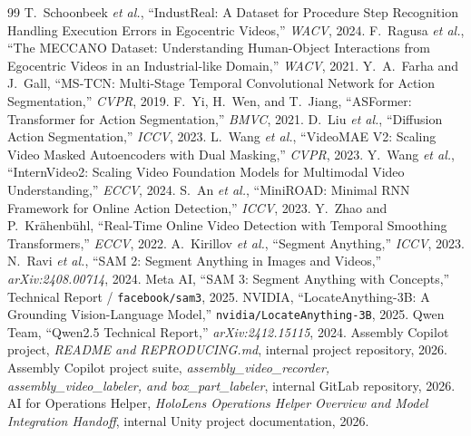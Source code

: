 \documentclass[11pt]{article}
\begin{document}
\begin{thebibliography}{99}
\small
{} T.~Schoonbeek \emph{et al.}, ``IndustReal: A Dataset for Procedure Step Recognition Handling
Execution Errors in Egocentric Videos,'' \emph{WACV}, 2024.
 F.~Ragusa \emph{et al.}, ``The MECCANO Dataset: Understanding Human-Object Interactions from
Egocentric Videos in an Industrial-like Domain,'' \emph{WACV}, 2021.
 Y.~A.~Farha and J.~Gall, ``MS-TCN: Multi-Stage Temporal Convolutional Network for Action
Segmentation,'' \emph{CVPR}, 2019.
 F.~Yi, H.~Wen, and T.~Jiang, ``ASFormer: Transformer for Action Segmentation,'' \emph{BMVC}, 2021.
 D.~Liu \emph{et al.}, ``Diffusion Action Segmentation,'' \emph{ICCV}, 2023.
 L.~Wang \emph{et al.}, ``VideoMAE V2: Scaling Video Masked Autoencoders with Dual Masking,''
\emph{CVPR}, 2023.
 Y.~Wang \emph{et al.}, ``InternVideo2: Scaling Video Foundation Models for Multimodal Video
Understanding,'' \emph{ECCV}, 2024.
 S.~An \emph{et al.}, ``MiniROAD: Minimal RNN Framework for Online Action Detection,''
\emph{ICCV}, 2023.
 Y.~Zhao and P.~Kr\"ahenb\"uhl, ``Real-Time Online Video Detection with Temporal Smoothing
Transformers,'' \emph{ECCV}, 2022.
 A.~Kirillov \emph{et al.}, ``Segment Anything,'' \emph{ICCV}, 2023.
 N.~Ravi \emph{et al.}, ``SAM 2: Segment Anything in Images and Videos,'' \emph{arXiv:2408.00714}, 2024.
 Meta AI, ``SAM 3: Segment Anything with Concepts,'' Technical Report / \texttt{facebook/sam3}, 2025.
 NVIDIA, ``LocateAnything-3B: A Grounding Vision-Language Model,''
\texttt{nvidia/LocateAnything-3B}, 2025.
 Qwen Team, ``Qwen2.5 Technical Report,'' \emph{arXiv:2412.15115}, 2024.
 Assembly Copilot project, \emph{README and REPRODUCING.md}, internal project repository,
2026.
 Assembly Copilot project suite, \emph{assembly\_video\_recorder,
assembly\_video\_labeler, and box\_part\_labeler}, internal GitLab repository, 2026.
 AI for Operations Helper, \emph{HoloLens Operations Helper Overview and Model Integration
Handoff}, internal Unity project documentation, 2026.
\end{thebibliography}
\end{document}
